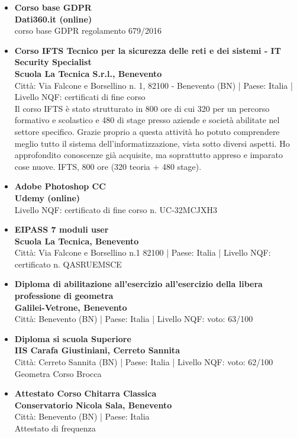 \documentclass[a4paper,10pt]{article}
\begin{document}
\begin{itemize}[leftmargin=*]
  \item \textbf{\textcolor{mainblue}{Corso base GDPR}}\\
  \textbf {Dati360.it (online) \quad {[27/03/2020]}}\\
  corso base GDPR regolamento 679/2016

  \item \textbf{\textcolor{mainblue}{Corso IFTS Tecnico per la sicurezza delle reti e dei sistemi - IT Security Specialist}}\\
  \textbf {Scuola La Tecnica S.r.l., Benevento \quad {[08/04/2019 – 20/12/2019]}}\\
  Città: Via Falcone e Borsellino n. 1, 82100 - Benevento (BN) | Paese: Italia | Livello NQF: certificati di fine corso \\
  Il corso IFTS è stato strutturato in 800 ore di cui 320 per un percorso formativo e scolastico e 480 di stage presso aziende e società abilitate nel settore specifico. Grazie proprio a questa attività ho potuto comprendere meglio tutto il sistema dell’informatizzazione, vista sotto diversi aspetti. Ho approfondito conoscenze già acquisite, ma soprattutto appreso e imparato cose nuove.
  IFTS, 800 ore (320 teoria + 480 stage).

  \item \textbf{\textcolor{mainblue}{Adobe Photoshop CC}}\\
  \textbf {Udemy (online) \quad {[29/03/2019]}}\\
  Livello NQF: certificato di fine corso n. UC-32MCJXH3

  \item \textbf{\textcolor{mainblue}{EIPASS 7 moduli user}}\\
  \textbf {Scuola La Tecnica, Benevento \quad {[07/09/2018]}}\\
  Città: Via Falcone e Borsellino n.1 82100 | Paese: Italia | Livello NQF: certificato n. QASRUEMSCE
  
  \item \textbf{\textcolor{mainblue}{Diploma di abilitazione all'esercizio all'esercizio della libera professione di geometra}}\\
  \textbf {Galilei-Vetrone, Benevento \quad {[17/12/2015]}}\\
  Città: Benevento (BN) | Paese: Italia | Livello NQF: voto: 63/100

  \item \textbf{\textcolor{mainblue}{Diploma si scuola Superiore}}\\
  \textbf {IIS Carafa Giustiniani, Cerreto Sannita \quad {[06/07/2011]}}\\
  Città: Cerreto Sannita (BN) | Paese: Italia | Livello NQF: voto: 62/100\\
  Geometra Corso Brocca

  \item \textbf{\textcolor{mainblue}{Attestato Corso Chitarra Classica}}\\
  \textbf {Conservatorio Nicola Sala, Benevento \quad {[2005–2011]}}\\
  Città: Benevento (BN) | Paese: Italia\\
  Attestato di frequenza
\end{itemize}
\end{document}
